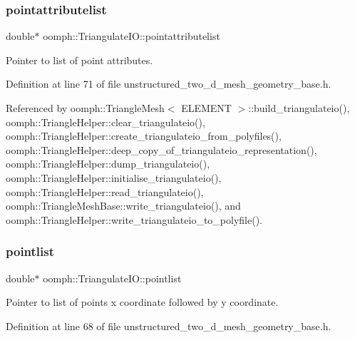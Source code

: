 \subsubsection{\texorpdfstring{pointattributelist}{pointattributelist}}
{\footnotesize\ttfamily double$\ast$ oomph\+::\+Triangulate\+I\+O\+::pointattributelist}



Pointer to list of point attributes. 



Definition at line 71 of file unstructured\+\_\+two\+\_\+d\+\_\+mesh\+\_\+geometry\+\_\+base.\+h.



Referenced by oomph\+::\+Triangle\+Mesh$<$ E\+L\+E\+M\+E\+N\+T $>$\+::build\+\_\+triangulateio(), oomph\+::\+Triangle\+Helper\+::clear\+\_\+triangulateio(), oomph\+::\+Triangle\+Helper\+::create\+\_\+triangulateio\+\_\+from\+\_\+polyfiles(), oomph\+::\+Triangle\+Helper\+::deep\+\_\+copy\+\_\+of\+\_\+triangulateio\+\_\+representation(), oomph\+::\+Triangle\+Helper\+::dump\+\_\+triangulateio(), oomph\+::\+Triangle\+Helper\+::initialise\+\_\+triangulateio(), oomph\+::\+Triangle\+Helper\+::read\+\_\+triangulateio(), oomph\+::\+Triangle\+Mesh\+Base\+::write\+\_\+triangulateio(), and oomph\+::\+Triangle\+Helper\+::write\+\_\+triangulateio\+\_\+to\+\_\+polyfile().

\mbox{\label{structoomph_1_1TriangulateIO_a479764c149b3afff010537ac129c8c3c}} 
\subsubsection{\texorpdfstring{pointlist}{pointlist}}
{\footnotesize\ttfamily double$\ast$ oomph\+::\+Triangulate\+I\+O\+::pointlist}



Pointer to list of points x coordinate followed by y coordinate. 



Definition at line 68 of file unstructured\+\_\+two\+\_\+d\+\_\+mesh\+\_\+geometry\+\_\+base.\+h.



